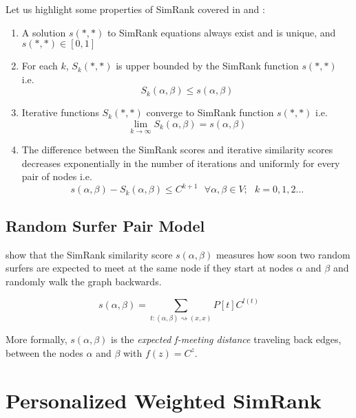 Let us highlight some properties of SimRank covered in \citep{Jeh02simrank} and \citep{LizorkinSimrank}:
\begin{enumerate}
\item A solution $s(\ast,\ast)$ to SimRank equations always exist and is unique, and $s(\ast,\ast) \in [0,1]$
\item For each $k$, $S_k(\ast,\ast)$ is upper bounded by the SimRank function $s(\ast,\ast)$ i.e.
\begin{equation}
 S_k(\alpha,\beta) \leq s(\alpha,\beta)
\end{equation}
\item Iterative functions $S_k(\ast,\ast)$ converge to SimRank function $s(\ast,\ast)$ i.e. 
\begin{equation}
\displaystyle \lim_{k \rightarrow \infty}S_k(\alpha,\beta)=s(\alpha,\beta)
\end{equation}
\item The difference between the SimRank scores and iterative similarity scores decreases exponentially in the number of iterations and uniformly for every pair of nodes i.e. 
\begin{equation} \label{SimRankExponentialConvergence}
s(\alpha,\beta) - S_k(\alpha,\beta) \leq C^{k+1} \mbox{\ \ \ \ }\forall \alpha,\beta \in V;\mbox{  } k=0,1,2\ldots
\end{equation}
\end{enumerate}

\subsection{Random Surfer Pair Model}
\citep{Jeh02simrank} show that the SimRank similarity score $s(\alpha,\beta)$ measures how soon two random surfers are expected to meet at the same node if they start at nodes $\alpha$ and $\beta$ and randomly walk the graph backwards.

\begin{equation}
s(\alpha,\beta) = \sum_{t:(\alpha,\beta) \rightsquigarrow (x,x)} P[t]C^{l(t)}  \label{eq:emd} 
\end{equation}

More formally, $s(\alpha,\beta)$ is the \textit{expected f-meeting distance} traveling back edges, between the nodes $\alpha$ and $\beta$ with $f(z)=C^z$.

\section{Personalized Weighted SimRank}
